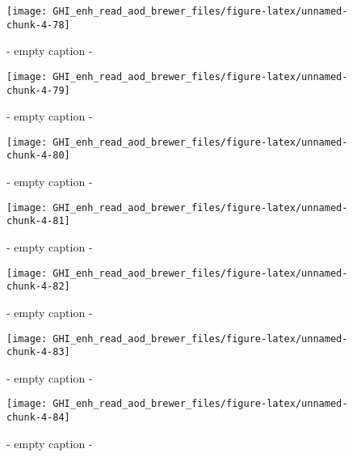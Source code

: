 \documentclass[
  10pt,
  a4paper,oneside]{article}
\begin{document}
\begin{figure}[H]

{\centering \texttt{[image: GHI\_enh\_read\_aod\_brewer\_files/figure-latex/unnamed-chunk-4-78]} 

}

\caption{ - empty caption - }\label{fig:unnamed-chunk-4-78}
\end{figure}
\begin{figure}[H]

{\centering \texttt{[image: GHI\_enh\_read\_aod\_brewer\_files/figure-latex/unnamed-chunk-4-79]} 

}

\caption{ - empty caption - }\label{fig:unnamed-chunk-4-79}
\end{figure}
\begin{figure}[H]

{\centering \texttt{[image: GHI\_enh\_read\_aod\_brewer\_files/figure-latex/unnamed-chunk-4-80]} 

}

\caption{ - empty caption - }\label{fig:unnamed-chunk-4-80}
\end{figure}
\begin{figure}[H]

{\centering \texttt{[image: GHI\_enh\_read\_aod\_brewer\_files/figure-latex/unnamed-chunk-4-81]} 

}

\caption{ - empty caption - }\label{fig:unnamed-chunk-4-81}
\end{figure}
\begin{figure}[H]

{\centering \texttt{[image: GHI\_enh\_read\_aod\_brewer\_files/figure-latex/unnamed-chunk-4-82]} 

}

\caption{ - empty caption - }\label{fig:unnamed-chunk-4-82}
\end{figure}
\begin{figure}[H]

{\centering \texttt{[image: GHI\_enh\_read\_aod\_brewer\_files/figure-latex/unnamed-chunk-4-83]} 

}

\caption{ - empty caption - }\label{fig:unnamed-chunk-4-83}
\end{figure}
\begin{figure}[H]

{\centering \texttt{[image: GHI\_enh\_read\_aod\_brewer\_files/figure-latex/unnamed-chunk-4-84]} 

}

\caption{ - empty caption - }\label{fig:unnamed-chunk-4-84}
\end{figure}
\end{document}
